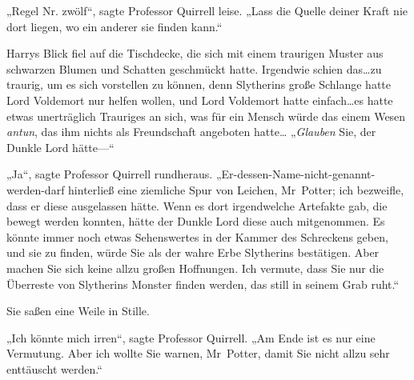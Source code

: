 „Regel Nr. zwölf“, sagte Professor Quirrell leise. „Lass die Quelle deiner Kraft nie dort liegen, wo ein anderer sie finden kann.“

Harrys Blick fiel auf die Tischdecke, die sich mit einem traurigen Muster aus schwarzen Blumen und Schatten geschmückt hatte. Irgendwie schien das…zu traurig, um es sich vorstellen zu können, denn Slytherins große Schlange hatte Lord Voldemort nur helfen wollen, und Lord Voldemort hatte einfach…es hatte etwas unerträglich Trauriges an sich, was für ein Mensch würde das einem Wesen \emph{antun}, das ihm nichts als Freundschaft angeboten hatte… „\emph{Glauben} Sie, der Dunkle Lord hätte—“

„Ja“, sagte Professor Quirrell rundheraus. „Er-dessen-Name-nicht-genannt-werden-darf hinterließ eine ziemliche Spur von Leichen, Mr~Potter; ich bezweifle, dass er diese ausgelassen hätte. Wenn es dort irgendwelche Artefakte gab, die bewegt werden konnten, hätte der Dunkle Lord diese auch mitgenommen. Es könnte immer noch etwas Sehenswertes in der Kammer des Schreckens geben, und sie zu finden, würde Sie als der wahre Erbe Slytherins bestätigen. Aber machen Sie sich keine allzu großen Hoffnungen. Ich vermute, dass Sie nur die Überreste von Slytherins Monster finden werden, das still in seinem Grab ruht.“

Sie saßen eine Weile in Stille.

„Ich könnte mich irren“, sagte Professor Quirrell. „Am Ende ist es nur eine Vermutung. Aber ich wollte Sie warnen, Mr~Potter, damit Sie nicht allzu sehr enttäuscht werden.“


